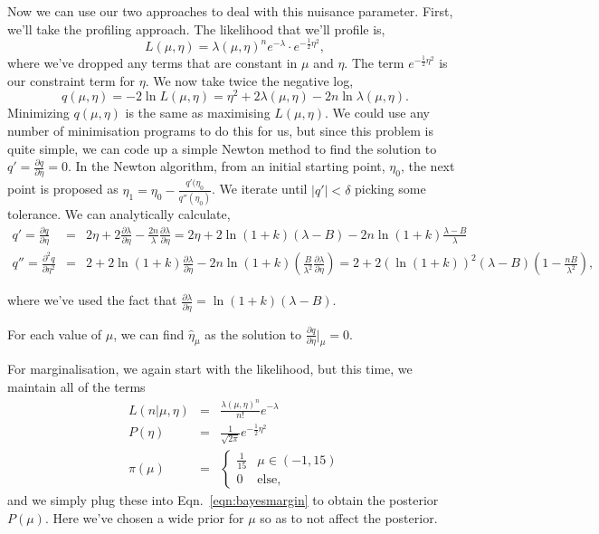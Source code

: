 Now we can use our two approaches to deal with this nuisance parameter. First, we'll take the profiling approach. The likelihood that we'll profile is,
\begin{equation}\label{eqn:lhcounting}
    L(\mu,\eta) = \lambda(\mu,\eta)^{n}e^{-\lambda}\cdot e^{-\frac{1}{2}\eta^{2}},
\end{equation}
where we've dropped any terms that are constant in $\mu$ and $\eta$. The term  $e^{-\frac{1}{2}\eta^{2}}$ is our constraint term for $\eta$. We now take twice the negative log,
\begin{equation}
    q(\mu,\eta) = -2\ln L(\mu,\eta) = \eta^{2}+2\lambda(\mu,\eta)-2n\ln\lambda(\mu,\eta).
\end{equation}
Minimizing $q(\mu,\eta)$ is the same as maximising $L(\mu,\eta)$. We could use any number of minimisation programs to do this for us, but since this problem is quite simple, we can code up a simple Newton method to find the solution to $q'=\frac{\partial q}{\partial \eta}=0$. In the Newton algorithm, from an initial starting point, $\eta_0$, the next point is proposed as $\eta_1=\eta_0-\frac{q'(\eta_{0}}{q''(\eta_0)}$. We iterate until $|q'|<\delta$ picking some tolerance. We can analytically calculate,
\begin{eqnarray}
    q'  =  \frac{\partial q}{\partial \eta} & = &   
    2\eta 
    +2\frac{\partial\lambda}{\partial \eta} 
    - \frac{2n}{\lambda}\frac{\partial\lambda}{\partial \eta} = 
    2\eta 
    + 2\ln(1+k) \left(\lambda-B\right)
    -2n\ln(1+k)\frac{\lambda - B}{\lambda}\\
    q''  =  \frac{\partial ^{2}q}{\partial \eta^{2}} 
    & = &   
    2 
    + 2\ln(1+k)\frac{\partial\lambda}{\partial \eta} 
    - 2n\ln(1+k)\left( \frac{B}{\lambda^{2}}\frac{\partial\lambda}{\partial \eta}  \right)
    = 
    2 
    + 2(\ln(1+k))^{2}\left(\lambda-B\right)\left( 1-\frac{nB}{\lambda^{2}}\right),
\end{eqnarray}

where we've used the fact that $\frac{\partial\lambda}{\partial \eta} =\ln(1+k)(\lambda-B)$.

For each value of $\mu$, we can find $\hat{\eta}_{\mu}$ as the solution to $\frac{\partial q}{\partial \eta}\biggr|_{\mu}=0$.

For marginalisation, we again start with the likelihood, but this time, we maintain all of the terms
\begin{eqnarray}
    L(n|\mu,\eta) & = & \frac{\lambda(\mu,\eta)^{n}}{n!}e^{-\lambda}\\
    P(\eta) & = & \frac{1}{\sqrt{2\pi}}e^{-\frac{1}{2}\eta^{2}}\\
    \pi(\mu) & = & \begin{cases}
                \frac{1}{15} & \mu \in (-1,15) \\
                0 & \mathrm{else,}
                \end{cases}
\end{eqnarray}
and we simply plug these into Eqn.~\ref{eqn:bayesmargin} to obtain the posterior $P(\mu)$. Here we've chosen a wide prior for $\mu$ so as to not affect the posterior.

